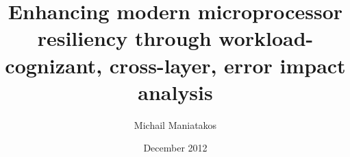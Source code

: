 \documentclass[12pt]{yalephd}
\begin{document}
\author{Michail Maniatakos}
\title{Enhancing modern microprocessor resiliency through workload-cognizant, cross-layer, error impact analysis}
\date{December 2012}
\end{document}
